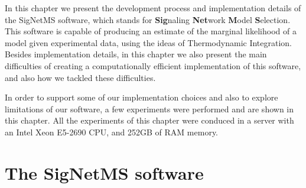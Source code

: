 In this chapter we present the development process and implementation
details of the SigNetMS software, which stands for {\bf Sig}naling 
{\bf Net}work {\bf M}odel {\bf S}election. This software is capable of
producing an estimate of the marginal likelihood of a model given
experimental data, using the ideas of Thermodynamic Integration. Besides
implementation details, in this chapter we also present the main 
difficulties of creating a computationally efficient implementation of
this software, and also how we tackled these difficulties. 

In order to support some of our implementation choices and also to
explore limitations of our software, a few experiments were performed
and are shown in this chapter. All the experiments of this chapter were
conduced in a server with an Intel Xeon E5-2690 CPU, and 252GB of RAM
memory.


\section{The SigNetMS software}



